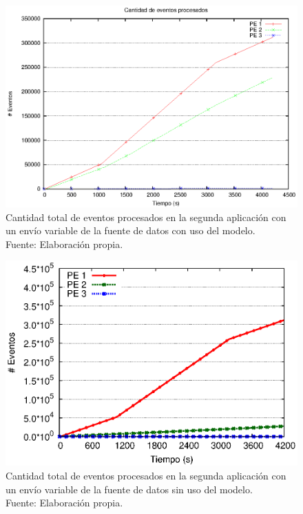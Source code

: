 \begin{figure}[!ht]
	\centering
	\captionsetup{justification=centering}
    \includegraphics[scale=0.7]{images/exp/app2/normal/cm/eventCount.eps}
    \caption[Cantidad total de eventos procesados en la segunda aplicaci\'on con un env\'io variable de la fuente de datos con uso del modelo.]{Cantidad total de eventos procesados en la segunda aplicaci\'on con un env\'io variable de la fuente de datos con uso del modelo.\\Fuente: Elaboraci\'on propia.}
    \label{fig:app2-normal-eventCount-cm}
\end{figure}

\begin{figure}[!ht]
	\centering
	\captionsetup{justification=centering}
    \includegraphics[scale=0.7]{images/exp/app2/normal/sm/eventCount.eps}
    \caption[Cantidad total de eventos procesados en la segunda aplicaci\'on con un env\'io variable de la fuente de datos sin uso del modelo.]{Cantidad total de eventos procesados en la segunda aplicaci\'on con un env\'io variable de la fuente de datos sin uso del modelo.\\Fuente: Elaboraci\'on propia.}
    \label{fig:app2-normal-eventCount-sm}
\end{figure}

